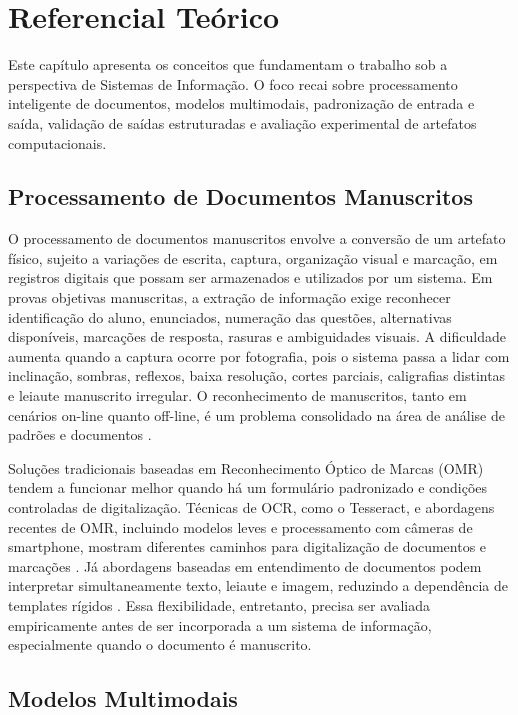 \chapter{Referencial Teórico}

Este capítulo apresenta os conceitos que fundamentam o trabalho sob a perspectiva de Sistemas de Informação. O foco recai sobre processamento inteligente de documentos, modelos multimodais, padronização de entrada e saída, validação de saídas estruturadas e avaliação experimental de artefatos computacionais.

\section{Processamento de Documentos Manuscritos}

O processamento de documentos manuscritos envolve a conversão de um artefato físico, sujeito a variações de escrita, captura, organização visual e marcação, em registros digitais que possam ser armazenados e utilizados por um sistema. Em provas objetivas manuscritas, a extração de informação exige reconhecer identificação do aluno, enunciados, numeração das questões, alternativas disponíveis, marcações de resposta, rasuras e ambiguidades visuais. A dificuldade aumenta quando a captura ocorre por fotografia, pois o sistema passa a lidar com inclinação, sombras, reflexos, baixa resolução, cortes parciais, caligrafias distintas e leiaute manuscrito irregular. O reconhecimento de manuscritos, tanto em cenários on-line quanto off-line, é um problema consolidado na área de análise de padrões e documentos \cite{plamondon2000handwriting,rassul2025handwritten}.

Soluções tradicionais baseadas em Reconhecimento Óptico de Marcas (OMR) tendem a funcionar melhor quando há um formulário padronizado e condições controladas de digitalização. Técnicas de OCR, como o Tesseract, e abordagens recentes de OMR, incluindo modelos leves e processamento com câmeras de smartphone, mostram diferentes caminhos para digitalização de documentos e marcações \cite{smith2007tesseract,mondal2023omrnet,hafeez2024omrsmartphone}. Já abordagens baseadas em entendimento de documentos podem interpretar simultaneamente texto, leiaute e imagem, reduzindo a dependência de templates rígidos \cite{xu2020layoutlm,kim2022donut}. Essa flexibilidade, entretanto, precisa ser avaliada empiricamente antes de ser incorporada a um sistema de informação, especialmente quando o documento é manuscrito.

\section{Modelos Multimodais}

